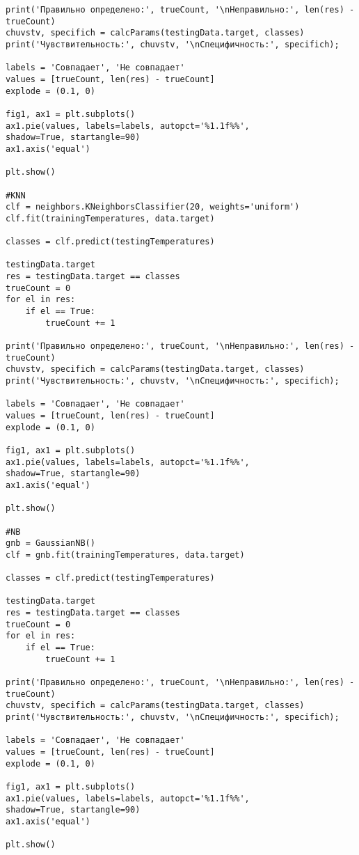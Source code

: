 \begin{verbatim}
print('Правильно определено:', trueCount, '\nНеправильно:', len(res) - trueCount)
chuvstv, specifich = calcParams(testingData.target, classes)
print('Чувствительность:', chuvstv, '\nСпецифичность:', specifich);

labels = 'Совпадает', 'Не совпадает'
values = [trueCount, len(res) - trueCount]
explode = (0.1, 0)

fig1, ax1 = plt.subplots()
ax1.pie(values, labels=labels, autopct='%1.1f%%',
shadow=True, startangle=90)
ax1.axis('equal')

plt.show()

#KNN
clf = neighbors.KNeighborsClassifier(20, weights='uniform')
clf.fit(trainingTemperatures, data.target)

classes = clf.predict(testingTemperatures)

testingData.target
res = testingData.target == classes
trueCount = 0
for el in res:
	if el == True:
		trueCount += 1

print('Правильно определено:', trueCount, '\nНеправильно:', len(res) - trueCount)
chuvstv, specifich = calcParams(testingData.target, classes)
print('Чувствительность:', chuvstv, '\nСпецифичность:', specifich);

labels = 'Совпадает', 'Не совпадает'
values = [trueCount, len(res) - trueCount]
explode = (0.1, 0)

fig1, ax1 = plt.subplots()
ax1.pie(values, labels=labels, autopct='%1.1f%%',
shadow=True, startangle=90)
ax1.axis('equal')

plt.show()

#NB
gnb = GaussianNB()
clf = gnb.fit(trainingTemperatures, data.target)

classes = clf.predict(testingTemperatures)

testingData.target
res = testingData.target == classes
trueCount = 0
for el in res:
	if el == True:
		trueCount += 1

print('Правильно определено:', trueCount, '\nНеправильно:', len(res) - trueCount)
chuvstv, specifich = calcParams(testingData.target, classes)
print('Чувствительность:', chuvstv, '\nСпецифичность:', specifich);

labels = 'Совпадает', 'Не совпадает'
values = [trueCount, len(res) - trueCount]
explode = (0.1, 0)

fig1, ax1 = plt.subplots()
ax1.pie(values, labels=labels, autopct='%1.1f%%',
shadow=True, startangle=90)
ax1.axis('equal')

plt.show()
\end{verbatim}
\vspace{8mm}
